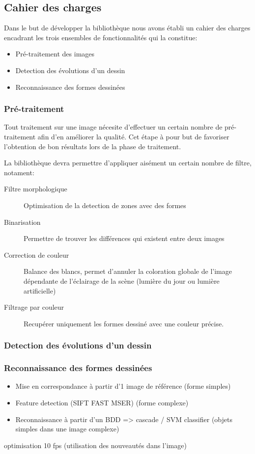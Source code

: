 \subsection{Cahier des charges}

Dans le but de développer la bibliothèque nous avons établi un cahier des charges encadrant les trois ensembles de fonctionnalités qui la constitue:
\begin{itemize}
\item Pré-traitement des images
\item Detection des évolutions d'un dessin
\item Reconnaissance des formes dessinées
\end{itemize}

\subsubsection{Pré-traitement}

Tout traitement sur une image nécesite d'effectuer un certain nombre de pré-traitement afin d'en améliorer la qualité. Cet étape à pour but de favoriser l'obtention de bon résultats lors de la phase de traitement.

La bibliothèque devra permettre d'appliquer aisément un certain nombre de filtre, notament:

\begin{description}
\item[Filtre morphologique] Optimisation de la detection de zones avec des formes
\item[Binarisation] Permettre de trouver les différences qui existent entre deux images
\item[Correction de couleur] Balance des blancs, permet d'annuler la coloration globale de l'image dépendante de l'éclairage de la scène (lumière du jour ou lumière artificielle)
\item[Filtrage par couleur] Recupérer uniquement les formes dessiné avec une couleur précise.
\end{description}


\subsubsection{Detection des évolutions d'un dessin}



\subsubsection{Reconnaissance des formes dessinées}
\begin{itemize}
\item Mise en correspondance à partir d’1 image de référence (forme simples)
\item Feature detection (SIFT FAST MSER) (forme complexe)
\item Reconnaissance à partir d’un BDD => cascade / SVM classifier (objets simples dans une image complexe)
\end{itemize}
optimisation 10 fps (utilisation des nouveautés dans l’image)


